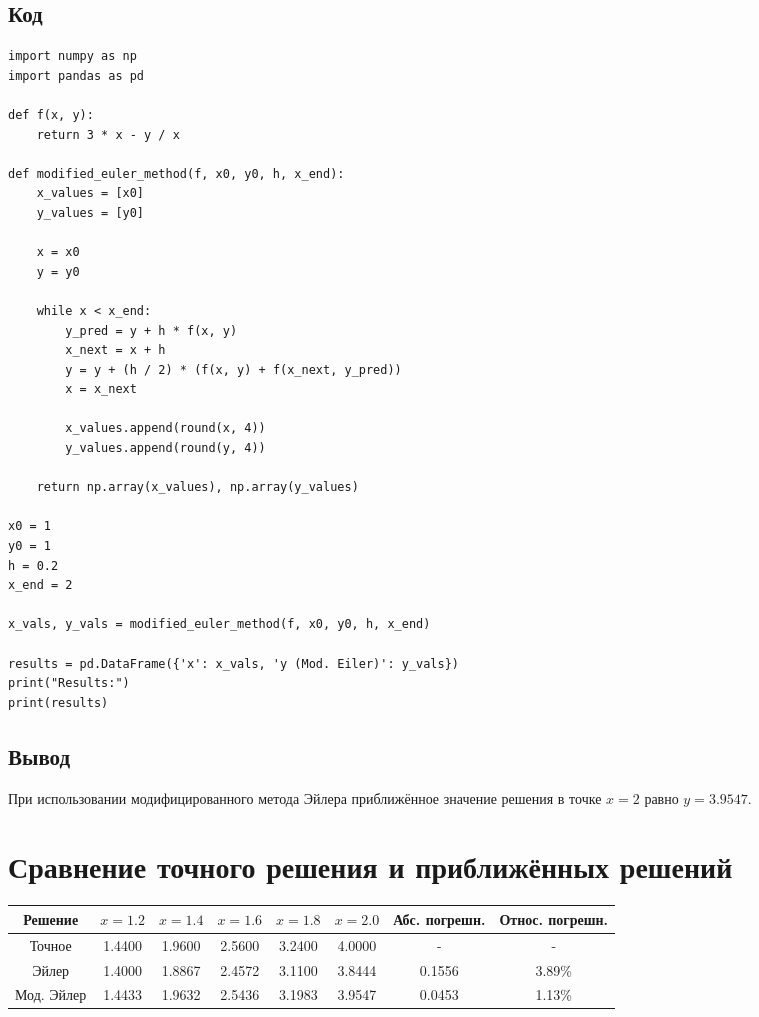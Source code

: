 \documentclass[a4paper,12pt]{article}
\begin{document}
\subsection*{Код}

\begin{lstlisting}
import numpy as np
import pandas as pd

def f(x, y):
    return 3 * x - y / x

def modified_euler_method(f, x0, y0, h, x_end):
    x_values = [x0]
    y_values = [y0]

    x = x0
    y = y0

    while x < x_end:
        y_pred = y + h * f(x, y)
        x_next = x + h
        y = y + (h / 2) * (f(x, y) + f(x_next, y_pred))
        x = x_next

        x_values.append(round(x, 4))
        y_values.append(round(y, 4))

    return np.array(x_values), np.array(y_values)

x0 = 1
y0 = 1
h = 0.2
x_end = 2

x_vals, y_vals = modified_euler_method(f, x0, y0, h, x_end)

results = pd.DataFrame({'x': x_vals, 'y (Mod. Eiler)': y_vals})
print("Results:")
print(results)

\end{lstlisting}
\subsection*{Вывод}
При использовании модифицированного метода Эйлера приближённое значение решения в точке \( x = 2 \) равно \( y = 3.9547 \).








\section{Сравнение точного решения и приближённых решений}

\begin{table}[h!]
\centering

\begin{tabular}{|c|c|c|c|c|c|c|c|}
\hline
Решение & \( x = 1.2 \) & \( x = 1.4 \) & \( x = 1.6 \) & \( x = 1.8 \) & \( x = 2.0 \) & Абс. погрешн. & Относ. погрешн. \\ \hline
Точное & 1.4400 & 1.9600 & 2.5600 & 3.2400 & 4.0000 & - & - \\ \hline
Эйлер & 1.4000 & 1.8867 & 2.4572 & 3.1100 & 3.8444 & 0.1556 & 3.89\% \\ \hline
Мод. Эйлер & 1.4433 & 1.9632 & 2.5436 & 3.1983 & 3.9547 & 0.0453 & 1.13\% \\ \hline
\end{tabular}
\end{table}
\end{document}
